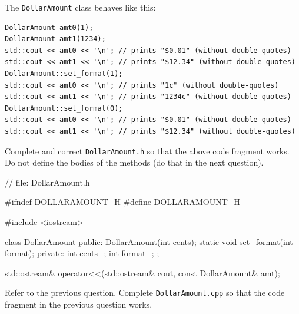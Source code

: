\nextq
The \verb!DollarAmount! class behaves like this:
\begin{Verbatim}[frame=single,fontsize=\footnotesize]
DollarAmount amt0(1);
DollarAmount amt1(1234);
std::cout << amt0 << '\n'; // prints "$0.01" (without double-quotes)
std::cout << amt1 << '\n'; // prints "$12.34" (without double-quotes)
DollarAmount::set_format(1);
std::cout << amt0 << '\n'; // prints "1c" (without double-quotes)
std::cout << amt1 << '\n'; // prints "1234c" (without double-quotes)
DollarAmount::set_format(0);
std::cout << amt0 << '\n'; // prints "$0.01" (without double-quotes)
std::cout << amt1 << '\n'; // prints "$12.34" (without double-quotes)
\end{Verbatim}
Complete and correct \verb!DollarAmount.h! so that the
above code fragment works.
Do not define the bodies of the methods (do that in the next question).
\\
\ANSWER
\begin{answercode}
// file: DollarAmount.h

#ifndef DOLLARAMOUNT_H
#define DOLLARAMOUNT_H

#include <iostream>

class DollarAmount
{
public:
DollarAmount(int cents);
static void set_format(int format);
private:
    int cents_;
    int format_;
};

std::ostream& operator<<(std::ostream& cout, const DollarAmount& amt);
\end{answercode}

\nextq
Refer to the previous question.
Complete \verb!DollarAmount.cpp! so that the code fragment in the previous
question works.
\\
\ANSWER
{}


